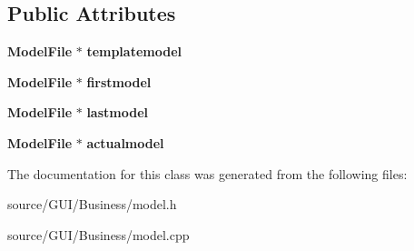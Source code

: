 \subsection*{Public Attributes}
\begin{DoxyCompactItemize}
\item 
{\bf Model\+File} $\ast$ {\bfseries templatemodel}\label{class_model_a99a16f5d2c73d7a7dc089ebc1a27e275}

\item 
{\bf Model\+File} $\ast$ {\bfseries firstmodel}\label{class_model_aa2ca706426abc4708d4163f205a4cdef}

\item 
{\bf Model\+File} $\ast$ {\bfseries lastmodel}\label{class_model_a595e8bcea1d796f883a90077286803ac}

\item 
{\bf Model\+File} $\ast$ {\bfseries actualmodel}\label{class_model_a703ad7bee8d0069450157d198f96a908}

\end{DoxyCompactItemize}


The documentation for this class was generated from the following files\+:\begin{DoxyCompactItemize}
\item 
source/\+G\+U\+I/\+Business/model.\+h\item 
source/\+G\+U\+I/\+Business/model.\+cpp\end{DoxyCompactItemize}
